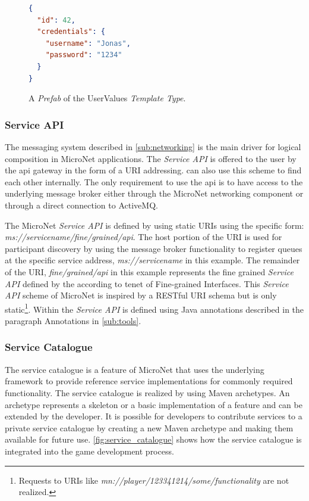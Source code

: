 \begin{figure}
\begin{lstlisting}[language=json,firstnumber=1] 
{
  "id": 42,
  "credentials": {
    "username": "Jonas",
    "password": "1234"
  }
}
\end{lstlisting}
\caption{A \textit{Prefab} of the UserValues \textit{Template Type}.}
\label{lst:prefab_type}
\end{figure}



\subsubsection{Service API}

The messaging system described in \autoref{sub:networking} is the main driver
for logical composition in MicroNet applications. The \textit{Service API} is
offered to the user by the \gls{api} gateway in the form of a URI addressing.
\mssuc{} can also use this scheme to find each other internally. The only
requirement to use the \gls{api} is to have access to the underlying message
broker either through the MicroNet networking component or through a direct
connection to ActiveMQ.

The MicroNet \textit{Service API} is defined by using static URIs using the
specific form: \textit{ms://servicename/fine/grained/api}. The host portion of
the URI is used for participant discovery by using the message broker
functionality to register queues at the specific service address,
\textit{ms://servicename} in this example. The remainder of the URI,
\textit{fine/grained/api} in this example represents the fine grained
\textit{Service API} defined by the \ms{} according to tenet of Fine-grained
Interfaces. This \textit{Service API} scheme of MicroNet is inspired by a
RESTful URI schema but is only static\footnote{Requests to URIs like
\textit{mn://player/123341214/some/functionality} are not realized.}. Within
\mss{} the \textit{Service API} is defined using Java annotations described in
the paragraph Annotations in \autoref{sub:tools}.

\subsubsection{Service Catalogue}

The service catalogue is a feature of MicroNet that uses the underlying
framework to provide reference service implementations for commonly required
functionality. The service catalogue is realized by using Maven archetypes. An
archetype represents a skeleton or a basic implementation of a feature and can
be extended by the developer. It is possible for developers to contribute
services to a private service catalogue by creating a new Maven archetype and
making them available for future use. \autoref{fig:service_catalogue} shows
how the service catalogue is integrated into the game development process.

